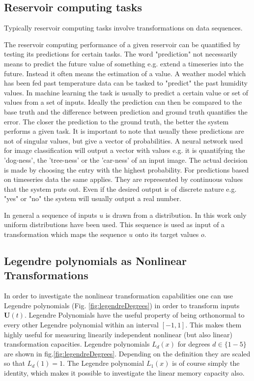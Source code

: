 \subsection{Reservoir computing tasks}

Typically reservoir computing tasks involve transformations on data sequences.

The reservoir computing performance of a given reservoir can be quantified by testing its predictions for certain tasks. The word "prediction" not necessarily means to predict the future value of something e.g. extend a timeseries into the future. Instead it often means the estimation of a value. A weather model which has been fed past temperature data can be tasked to "predict" the past humidity values. In machine learning the task is usually to predict a certain value or set of values from a set of inputs. Ideally the prediction can then be compared to the base truth and the difference between prediction and ground truth quantifies the error. The closer the prediction to the ground truth, the better the system performs a given task. 
It is important to note that usually these predictions are not of singular values, but give a vector of probabilities. A neural network used for image classification will output a vector with values e.g. it is quantifying the 'dog-ness', the 'tree-ness' or the 'car-ness' of an input image. The actual decision is made by choosing the entry with the highest probability. 
For predictions based on timeseries data the same applies. They are represented by continuous values that the system puts out. Even if the desired output is of discrete nature e.g. "yes" or "no" the system will usually output a real number. 

In general a sequence of inputs $u$ is drawn from a distribution. In this work only uniform distributions have been used. This sequence is used as input of a transformation which maps the sequence $u$ onto its target values $o$.


\subsection{Legendre polynomials as Nonlinear Transformations}

In order to investigate the nonlinear transformation capabilities one can use Legendre polynomials  (Fig. \ref{fig:legendreDegrees}) in order to transform inputs $\textbf{U}(t)$.	Legendre Polynomials have the useful property of being orthonormal to every other Legendre polynomial within an interval $\left[-1,1\right]$. This makes them highly useful for measuring linearily independent nonlinear (but also linear) transformation capacities. Legendre polynomials $L_{d}(x)$ for degrees $d \in \{1-5\}$ are shown in fig.\ref{fig:legendreDegrees}. Depending on the definition they are scaled so that $L_{d}(1)=1$. The Legendre polynomial $L_{1}(x)$ is of course simply the identity, which makes it possible to investigate the linear memory capacity also.


